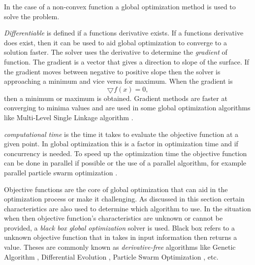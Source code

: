 In the case of a non-convex function a global optimization method is used to solve the problem. 

\textit{Differentiable} is defined if a functions derivative exists. If a functions derivative does exist, then it can be used to aid global optimization to converge to a solution faster. The solver uses the derivative to determine the \textit{gradient} of function. The gradient is a vector that gives a direction to slope of the surface. If the gradient moves between negative to positive slope then the solver is approaching a minimum and vice versa for maximum. When the gradient is
\begin{equation}
    \bigtriangledown f(x) = 0,
\end{equation}
then a minimum or maximum is obtained. Gradient methods are faster at converging to minima values and are used in some global optimization algorithms like Multi-Level Single Linkage algorithm \cite{Liberti2000}.

\textit{computational time} is the time it takes to evaluate the objective function at a given point. In global optimization this is a factor in optimization time and if concurrency is needed. To speed up the optimization time the objective function can be done in parallel if possible or the use of a parallel algorithm, for example parallel particle swarm optimization \cite{Hung2012}. 

Objective functions are the core of global optimization that  can aid in the optimization process or make it challenging. As discussed in this section certain characteristics are also used to determine which algorithm to use. In the situation when then objective function's characteristics are unknown or cannot be provided, a \textit{black box global
optimization} solver is used. Black box refers to a unknown objective function that in takes in input information then returns a value. Theses are commonly known as \textit{derivative-free} algorithms like Genetic Algorithm \cite{Aguiar}, Differential Evolution \cite{Aguiar}, Particle Swarm Optimization \cite{Kennedy1995}, etc.



